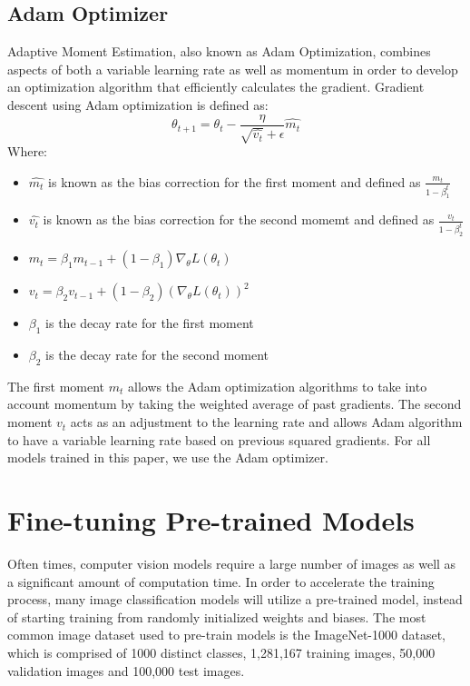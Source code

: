 \documentclass [MAS] {uclathes}
\begin{document}
\subsection{Adam Optimizer}
Adaptive Moment Estimation, also known as Adam Optimization, combines aspects of both a variable learning rate as well 
as momentum in order to develop an optimization algorithm that efficiently calculates the gradient. Gradient descent 
using Adam optimization is defined as:
\[\theta_{t+1} = \theta_{t} - \frac{\eta}{\sqrt{\hat{v_t}} + \epsilon} \hat{m_{t}}\]
Where:
\begin{itemize}
    \item \(\hat{m_{t}}\) is known as the bias correction for the first moment and defined as \(\frac{m_t}{1-\beta_1^t}\)
    \item \(\hat{v_t}\) is known as the bias correction for the second momemt and defined as \(\frac{v_t}{1-\beta_2^t}\)
    \item \(m_t = \beta_1 m_{t-1} + (1 - \beta_1) \nabla_{\theta} L(\theta_t)\)
    \item \(v_t = \beta_2 v_{t-1} + (1 - \beta_2) (\nabla_{\theta} L(\theta_t))^2\)
    \item \(\beta_1\) is the decay rate for the first moment
    \item \(\beta_2\) is the decay rate for the second moment
\end{itemize}

The first moment \(m_t\) allows the Adam optimization algorithms to take into account momentum by taking the weighted 
average of past gradients. The second moment \(v_t\) acts as an adjustment to the learning rate and allows Adam 
algorithm to have a variable learning rate based on previous squared gradients. For all models trained in this paper, we 
use the Adam optimizer.

\section{Fine-tuning Pre-trained Models}
Often times, computer vision models require a large number of images as well as a significant amount of computation 
time. In order to accelerate the training process, many image classification models will utilize a pre-trained model, 
instead of starting training from randomly initialized weights and biases. The most common image dataset used to 
pre-train models is the ImageNet-1000 dataset, which is comprised of 1000 distinct classes, 1,281,167 training images, 
50,000 validation images and 100,000 test images.
\end{document}
